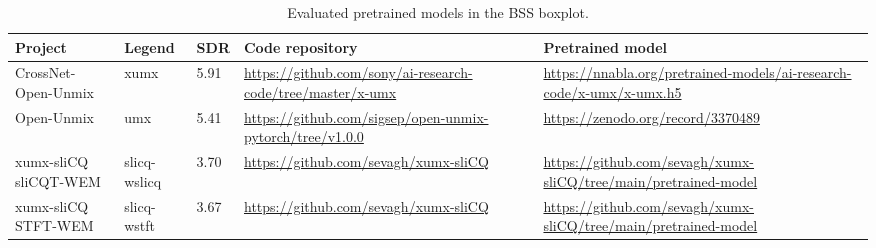 \documentclass[report.tex]{subfiles}
\begin{document}
\begin{table}[ht]
	\centering
	\caption{Evaluated pretrained models in the BSS boxplot.}
	\label{table:bsseval}
	\begin{tabular}{ |p{2.5cm}|l|l|p{4cm}|p{4cm}| }
	 \hline
		Project & Legend & SDR & Code repository & Pretrained model \\
	 \hline
	 \hline
		CrossNet-Open-Unmix & xumx & 5.91 & \url{https://github.com/sony/ai-research-code/tree/master/x-umx} & \url{https://nnabla.org/pretrained-models/ai-research-code/x-umx/x-umx.h5} \\
	 \hline
		Open-Unmix & umx & 5.41 & \url{https://github.com/sigsep/open-unmix-pytorch/tree/v1.0.0} & \url{https://zenodo.org/record/3370489} \\
	 \hline
		\makecell[l]{xumx-sliCQ \\ sliCQT-WEM} & slicq-wslicq & 3.70 & \url{https://github.com/sevagh/xumx-sliCQ} & \url{https://github.com/sevagh/xumx-sliCQ/tree/main/pretrained-model} \\
	 \hline
		\makecell[l]{xumx-sliCQ \\ STFT-WEM} & slicq-wstft & 3.67 & \url{https://github.com/sevagh/xumx-sliCQ} & \url{https://github.com/sevagh/xumx-sliCQ/tree/main/pretrained-model} \\
	 \hline
\end{tabular}
\end{table}
\end{document}
